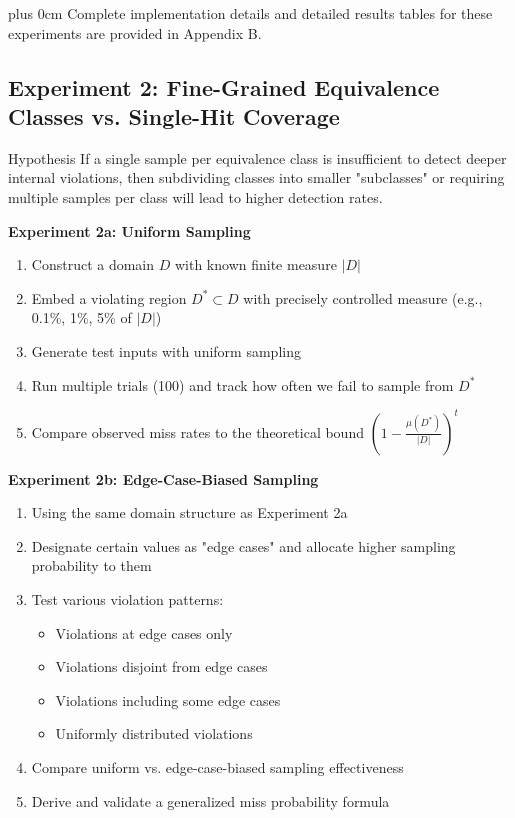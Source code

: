 \documentclass[conference]{IEEEtran}
\newcommand{\justifytext}{\leftskip=0pt \rightskip=0pt plus 0cm}
\begin{document}
\justifytext
Complete implementation details and detailed results tables for these experiments are provided in Appendix B.

\subsection{Experiment 2: Fine-Grained Equivalence Classes vs. Single-Hit Coverage}
\label{subsec:experiment2}

\begin{theorembox}{Hypothesis}
If a single sample per equivalence class is insufficient to detect deeper internal violations, then subdividing classes into smaller "subclasses" or requiring multiple samples per class will lead to higher detection rates.
\end{theorembox}

\begin{tcolorbox}[
  colback=blue!5!white,
  colframe=blue!75!black,
  title=Experimental Design,
  fonttitle=\bfseries
]

\textbf{Experiment 2a: Uniform Sampling}
\begin{enumerate}
\item Construct a domain $D$ with known finite measure $|D|$
\item Embed a violating region $D^* \subset D$ with precisely controlled measure (e.g., 0.1\%, 1\%, 5\% of $|D|$)
\item Generate test inputs with uniform sampling
\item Run multiple trials (100) and track how often we fail to sample from $D^*$
\item Compare observed miss rates to the theoretical bound $\left(1 - \frac{\mu(D^*)}{|D|}\right)^t$
\end{enumerate}

\textbf{Experiment 2b: Edge-Case-Biased Sampling}
\begin{enumerate}
\item Using the same domain structure as Experiment 2a
\item Designate certain values as "edge cases" and allocate higher sampling probability to them
\item Test various violation patterns:
   \begin{itemize}
   \item Violations at edge cases only
   \item Violations disjoint from edge cases
   \item Violations including some edge cases
   \item Uniformly distributed violations
   \end{itemize}
\item Compare uniform vs. edge-case-biased sampling effectiveness
\item Derive and validate a generalized miss probability formula
\end{enumerate}
\end{tcolorbox}
\end{document}
